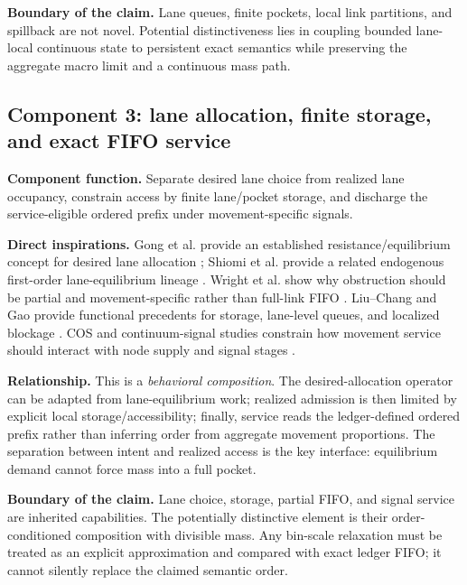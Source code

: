\documentclass[11pt,a4paper]{article}
\begin{document}
\textbf{Boundary of the claim.} Lane queues, finite pockets, local link partitions, and spillback are not novel. Potential distinctiveness lies in coupling bounded lane-local continuous state to persistent exact semantics while preserving the aggregate macro limit and a continuous mass path.

\subsection{Component 3: lane allocation, finite storage, and exact FIFO service}

\textbf{Component function.} Separate desired lane choice from realized lane occupancy, constrain access by finite lane/pocket storage, and discharge the service-eligible ordered prefix under movement-specific signals.

\textbf{Direct inspirations.} Gong et al. provide an established resistance/equilibrium concept for desired lane allocation \cite{gong2025}; Shiomi et al. provide a related endogenous first-order lane-equilibrium lineage \cite{shiomi2015}. Wright et al. show why obstruction should be partial and movement-specific rather than full-link FIFO \cite{wright2017}. Liu--Chang and Gao provide functional precedents for storage, lane-level queues, and localized blockage \cite{liu2011,gao2012}. COS and continuum-signal studies constrain how movement service should interact with node supply and signal stages \cite{han2014,yahya2023}.

\textbf{Relationship.} This is a \emph{behavioral composition}. The desired-allocation operator can be adapted from lane-equilibrium work; realized admission is then limited by explicit local storage/accessibility; finally, service reads the ledger-defined ordered prefix rather than inferring order from aggregate movement proportions. The separation between intent and realized access is the key interface: equilibrium demand cannot force mass into a full pocket.

\textbf{Boundary of the claim.} Lane choice, storage, partial FIFO, and signal service are inherited capabilities. The potentially distinctive element is their order-conditioned composition with divisible mass. Any bin-scale relaxation must be treated as an explicit approximation and compared with exact ledger FIFO; it cannot silently replace the claimed semantic order.
\end{document}
